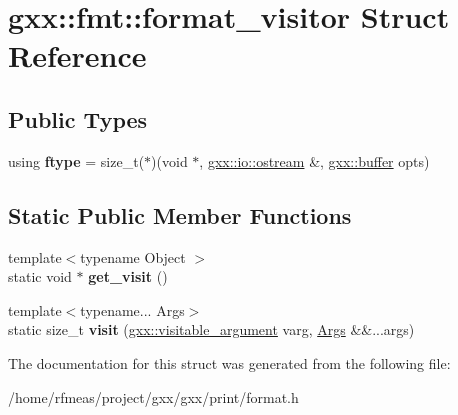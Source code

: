 \hypertarget{structgxx_1_1fmt_1_1format__visitor}{}\section{gxx\+:\+:fmt\+:\+:format\+\_\+visitor Struct Reference}
\label{structgxx_1_1fmt_1_1format__visitor}
\subsection*{Public Types}
\begin{DoxyCompactItemize}
\item 
using {\bfseries ftype} = size\+\_\+t($\ast$)(void $\ast$, \hyperlink{classgxx_1_1io_1_1ostream}{gxx\+::io\+::ostream} \&, \hyperlink{classgxx_1_1buffer}{gxx\+::buffer} opts)\hypertarget{structgxx_1_1fmt_1_1format__visitor_aa2e6066d9d3b3c6128bdd4ed8c508b4b}{}\label{structgxx_1_1fmt_1_1format__visitor_aa2e6066d9d3b3c6128bdd4ed8c508b4b}

\end{DoxyCompactItemize}
\subsection*{Static Public Member Functions}
\begin{DoxyCompactItemize}
\item 
{\footnotesize template$<$typename Object $>$ }\\static void $\ast$ {\bfseries get\+\_\+visit} ()\hypertarget{structgxx_1_1fmt_1_1format__visitor_a6e006d730cfaaf78c624f49a01ca3d3e}{}\label{structgxx_1_1fmt_1_1format__visitor_a6e006d730cfaaf78c624f49a01ca3d3e}

\item 
{\footnotesize template$<$typename... Args$>$ }\\static size\+\_\+t {\bfseries visit} (\hyperlink{structgxx_1_1visitable__argument}{gxx\+::visitable\+\_\+argument} varg, \hyperlink{structArgs}{Args} \&\&...args)\hypertarget{structgxx_1_1fmt_1_1format__visitor_ac8ce52b4143c92ee832d113d52cdb138}{}\label{structgxx_1_1fmt_1_1format__visitor_ac8ce52b4143c92ee832d113d52cdb138}

\end{DoxyCompactItemize}


The documentation for this struct was generated from the following file\+:\begin{DoxyCompactItemize}
\item 
/home/rfmeas/project/gxx/gxx/print/format.\+h\end{DoxyCompactItemize}
